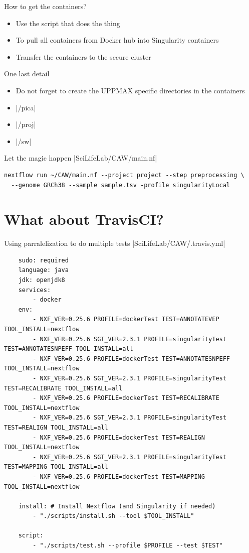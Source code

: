 \documentclass{beamer}
\begin{document}
\begin{frame}{How to get the containers?}
	\begin{itemize}
		\item Use the script that does the thing
		\pause
		\item To pull all containers from Docker hub into Singularity containers
		\pause
		\item Transfer the containers to the secure cluster
	\end{itemize}
\end{frame}

\begin{frame}{One last detail}
	\begin{itemize}
		\item Do not forget to create the UPPMAX specific directories in the containers
		\pause
		\item {}|/pica|
		\item {}|/proj|
		\item {}|/sw|
	\end{itemize}
\end{frame}

\begin{frame}[fragile]{Let the magic happen}
|SciLifeLab/CAW/main.nf|
\begin{verbatim}
nextflow run ~/CAW/main.nf --project project --step preprocessing \
  --genome GRCh38 --sample sample.tsv -profile singularityLocal
\end{verbatim}
\end{frame}

\section{What about TravisCI?}

\begin{frame}[fragile]{Using parralelization to do multiple tests}
\mint[fontsize=\small]{html}|SciLifeLab/CAW/.travis.yml|
\begin{verbatim}
	sudo: required
	language: java
	jdk: openjdk8
	services:
		- docker
	env:
		- NXF_VER=0.25.6 PROFILE=dockerTest TEST=ANNOTATEVEP TOOL_INSTALL=nextflow
		- NXF_VER=0.25.6 SGT_VER=2.3.1 PROFILE=singularityTest TEST=ANNOTATESNPEFF TOOL_INSTALL=all
		- NXF_VER=0.25.6 PROFILE=dockerTest TEST=ANNOTATESNPEFF TOOL_INSTALL=nextflow
		- NXF_VER=0.25.6 SGT_VER=2.3.1 PROFILE=singularityTest TEST=RECALIBRATE TOOL_INSTALL=all
		- NXF_VER=0.25.6 PROFILE=dockerTest TEST=RECALIBRATE TOOL_INSTALL=nextflow
		- NXF_VER=0.25.6 SGT_VER=2.3.1 PROFILE=singularityTest TEST=REALIGN TOOL_INSTALL=all
		- NXF_VER=0.25.6 PROFILE=dockerTest TEST=REALIGN TOOL_INSTALL=nextflow
		- NXF_VER=0.25.6 SGT_VER=2.3.1 PROFILE=singularityTest TEST=MAPPING TOOL_INSTALL=all
		- NXF_VER=0.25.6 PROFILE=dockerTest TEST=MAPPING TOOL_INSTALL=nextflow

	install: # Install Nextflow (and Singularity if needed)
		- "./scripts/install.sh --tool $TOOL_INSTALL"

	script:
		- "./scripts/test.sh --profile $PROFILE --test $TEST"
\end{verbatim}
\end{frame}
\end{document}

